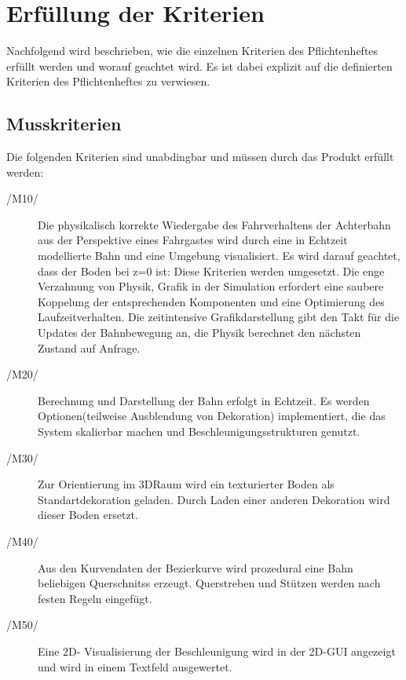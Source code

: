 \chapter{Erfüllung der Kriterien}

Nachfolgend wird beschrieben, wie die einzelnen Kriterien des Pflichtenheftes
erfüllt werden und worauf geachtet wird.  Es ist dabei explizit auf die
definierten Kriterien des Pflichtenheftes zu verwiesen.
\section{Musskriterien}

Die folgenden Kriterien sind unabdingbar und müssen durch das Produkt erfüllt
werden:
\begin{description}
	\item[/M10/] Die physikalisch korrekte Wiedergabe des Fahrverhaltens der Achterbahn aus der Perspektive eines Fahrgastes wird durch eine in Echtzeit modellierte Bahn und eine Umgebung visualisiert. Es wird darauf geachtet, dass der Boden bei z=0 ist: Diese Kriterien werden umgesetzt. Die enge Verzahnung von Physik, Grafik in der Simulation erfordert eine saubere Koppelung der entsprechenden Komponenten und
eine Optimierung des Laufzeitverhalten. Die zeitintensive Grafikdarstellung gibt den Takt für die Updates der Bahnbewegung an, die Physik berechnet den nächsten Zustand auf Anfrage.
	\item[/M20/] Berechnung und Darstellung der Bahn erfolgt in Echtzeit. Es werden Optionen(teilweise Ausblendung von Dekoration) implementiert, die das System skalierbar machen und Beschleunigungsstrukturen genutzt.
	\item[/M30/] Zur Orientierung im 3DRaum wird ein texturierter Boden als Standartdekoration geladen. Durch Laden einer anderen Dekoration wird dieser Boden ersetzt.
	\item[/M40/] Aus den Kurvendaten der Bezierkurve wird prozedural eine Bahn beliebigen Querschnitss erzeugt. Querstreben und Stützen werden nach festen Regeln eingefügt.
	\item[/M50/] Eine 2D- Visualisierung der Beschleunigung wird in der 2D-GUI angezeigt und wird in einem Textfeld ausgewertet.
\end{description}

